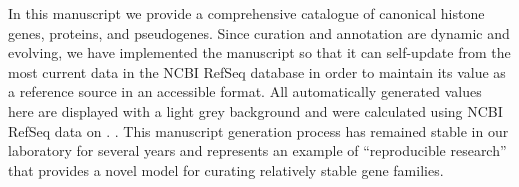     In this manuscript we provide a comprehensive catalogue
    of canonical histone genes, proteins, and pseudogenes.
    Since curation and annotation are dynamic and evolving,
    we have implemented the manuscript so that it can
    self-update from the most current data in the NCBI RefSeq database
    in order to maintain its value as a reference source in an accessible format.
    All automatically generated values here are displayed with a light grey background
    and were calculated using NCBI RefSeq data on \SequencesDate{}.
    .
    This manuscript generation process has remained stable in our laboratory for several years
    and represents an example of ``reproducible research'' \citep{Claerbout2000}
    that provides a novel model for curating relatively stable gene families.

